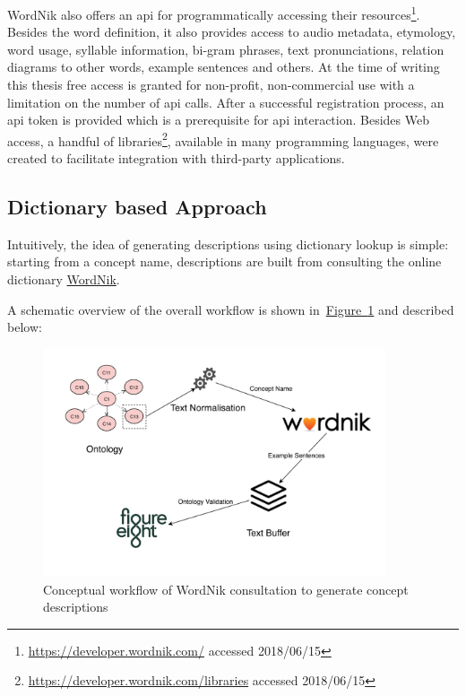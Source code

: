 WordNik also offers an \gls{api} for programmatically accessing their resources\footnote{\url{https://developer.wordnik.com/} accessed 2018/06/15}. Besides the word definition, it also provides access to audio metadata, etymology, word usage, syllable information, bi-gram phrases, text pronunciations, relation diagrams to other words, example sentences and others. At the time of writing this thesis free access is granted for non-profit, non-commercial use with a limitation on the number of \gls{api} calls. 
After a successful registration process, an \gls{api} token is provided which is a prerequisite for \gls{api} interaction. Besides Web access, a handful of libraries\footnote{\url{https://developer.wordnik.com/libraries} accessed 2018/06/15}, available in many programming languages, were created to facilitate integration with third-party applications. 

\subsection{Dictionary based Approach}\label{sec:enrichment_dictionary_approach}
Intuitively, the idea of generating descriptions using dictionary lookup is simple: starting from a concept name, descriptions are built from consulting the online dictionary \hyperref[sec:wordnik]{WordNik}. 

A schematic overview of the overall workflow is shown in~\hyperref[fig:external_source_workflow]{Figure~\ref*{fig:external_source_workflow}} and described below:
\begin{figure}
	 \centering
	 \includegraphics[width=0.9\textwidth]{drawio/External_Source_Workflow}
	 \caption{Conceptual workflow of WordNik consultation to generate concept descriptions}\label{fig:external_source_workflow}
\end{figure}

